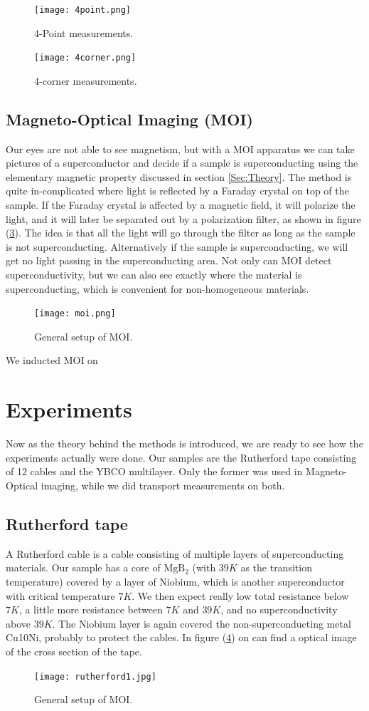 \documentclass{comjnl}
\newcommand*\chem[1]{\ensuremath{\mathrm{#1}}}
\begin{document}
\begin{figure}[h]
\centering
\texttt{[image: 4point.png]}
\caption{4-Point measurements.  \label{fig:4point}}
\end{figure}
\begin{figure}[h]
\centering
\texttt{[image: 4corner.png]}
\caption{4-corner measurements.  \label{fig:4corner}}
\end{figure}

\subsection{Magneto-Optical Imaging (MOI)}
Our eyes are not able to see magnetism, but with a MOI apparatus we can take pictures of a superconductor and decide if a sample is superconducting using the elementary magnetic property discussed in section \ref{Sec:Theory}. The method is quite in-complicated where light is reflected by a Faraday crystal on top of the sample. If the Faraday crystal is affected by a magnetic field, it will polarize the light, and it will later be separated out by a polarization filter, as shown in figure (\ref{fig:MOI}). The idea is that all the light will go through the filter as long as the sample is not superconducting. Alternatively if the sample is superconducting, we will get no light passing in the superconducting area. Not only can MOI detect superconductivity, but we can also see exactly where the material is superconducting, which is convenient for non-homogeneous materials. 
\begin{figure}[h]
\centering
\texttt{[image: moi.png]}
\caption{General setup of MOI. \label{fig:MOI}}
\end{figure}
We inducted MOI on 

\section{Experiments}\label{Sec:Experiments}
Now as the theory behind the methods is introduced, we are ready to see how the experiments actually were done. Our samples are the Rutherford tape consisting of 12 cables and the YBCO multilayer. Only the former was used in Magneto-Optical imaging, while we did transport measurements on both. 

\subsection{Rutherford tape}
A Rutherford cable is a cable consisting of multiple layers of superconducting materials. Our sample has a core of \chem{MgB_2} (with $39K$ as the transition temperature) covered by a layer of Niobium, which is another superconductor with critical temperature $7K$. We then expect really low total resistance below $7K$, a little more resistance between $7K$ and $39K$, and no superconductivity above $39K$. The Niobium layer is again covered the non-superconducting metal Cu10Ni, probably to protect the cables. In figure (\ref{fig:rutherford2}) on can find a optical image of the cross section of the tape. 
\begin{figure}[h]
\centering
\texttt{[image: rutherford1.jpg]}
\caption{General setup of MOI. \label{fig:rutherford2}}
\end{figure}
\end{document}
